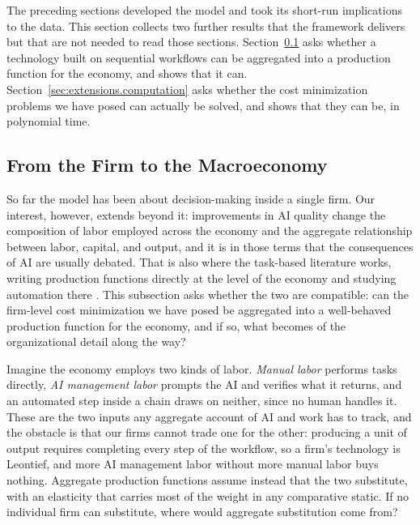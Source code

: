 The preceding sections developed the model and took its short-run implications to the data.
This section collects two further results that the framework delivers but that are not needed to read those sections.
Section~\ref{sec:extensions.aggregation} asks whether a technology built on sequential workflows can be aggregated into a production function for the economy, and shows that it can.
Section~\ref{sec:extensions.computation} asks whether the cost minimization problems we have posed can actually be solved, and shows that they can be, in polynomial time.


\subsection{From the Firm to the Macroeconomy}
\label{sec:extensions.aggregation}

So far the model has been about decision-making inside a single firm.
Our interest, however, extends beyond it: improvements in AI quality change the composition of labor employed across the economy and the aggregate relationship between labor, capital, and output, and it is in those terms that the consequences of AI are usually debated.
That is also where the task-based literature works, writing production functions directly at the level of the economy and studying automation there \citep{acemoglu2018, acemoglu2022artificial, acemoglu2024tasks}.
This subsection asks whether the two are compatible: can the firm-level cost minimization we have posed be aggregated into a well-behaved production function for the economy, and if so, what becomes of the organizational detail along the way?

Imagine the economy employs two kinds of labor.
\emph{Manual labor} performs tasks directly, \emph{AI management labor} prompts the AI and verifies what it returns, and an automated step inside a chain draws on neither, since no human handles it.
These are the two inputs any aggregate account of AI and work has to track, and the obstacle is that our firms cannot trade one for the other: producing a unit of output requires completing every step of the workflow, so a firm's technology is Leontief, and more AI management labor without more manual labor buys nothing.
Aggregate production functions assume instead that the two substitute, with an elasticity that carries most of the weight in any comparative static.
If no individual firm can substitute, where would aggregate substitution come from?

